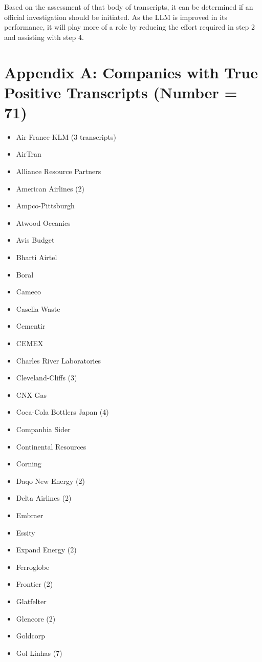 Based on the assessment of that body of transcripts, it can be determined if an official investigation should be initiated. As the LLM is improved in its performance, it will play more of a role by reducing the effort required in step 2 and assisting with step 4.

\section*{Appendix A: Companies with True Positive Transcripts (Number = 71)}
\begin{itemize}
    \item Air France-KLM (3 transcripts)
    \item AirTran
    \item Alliance Resource Partners
    \item American Airlines (2)
    \item Ampco-Pittsburgh
    \item Atwood Oceanics
    \item Avis Budget
    \item Bharti Airtel
    \item Boral
    \item Cameco
    \item Casella Waste
    \item Cementir
    \item CEMEX
    \item Charles River Laboratories
    \item Cleveland-Cliffs (3)
    \item CNX Gas
    \item Coca-Cola Bottlers Japan (4)
    \item Companhia Sider
    \item Continental Resources
    \item Corning
    \item Daqo New Energy (2)
    \item Delta Airlines (2)
    \item Embraer
    \item Essity
    \item Expand Energy (2)
    \item Ferroglobe
    \item Frontier (2)
    \item Glatfelter
    \item Glencore (2)
    \item Goldcorp
    \item Gol Linhas (7)

\end{itemize}

